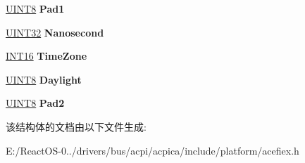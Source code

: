 \begin{DoxyCompactItemize}
\hyperlink{_processor_bind_8h_ab27e9918b538ce9d8ca692479b375b6a}{U\+I\+N\+T8} {\bfseries Pad1}
\item 
\mbox{\label{struct_a_c_p_i___e_f_i___t_i_m_e_af2ab8a79139fa93ad67d5b965c0c0271}} 
\hyperlink{_processor_bind_8h_ae1e6edbbc26d6fbc71a90190d0266018}{U\+I\+N\+T32} {\bfseries Nanosecond}
\item 
\mbox{\label{struct_a_c_p_i___e_f_i___t_i_m_e_ae92b53dcc68a3d322abbb6636da35bf9}} 
\hyperlink{_processor_bind_8h_a30f500129d8c688af07726d5d34ce52d}{I\+N\+T16} {\bfseries Time\+Zone}
\item 
\mbox{\label{struct_a_c_p_i___e_f_i___t_i_m_e_a6e7385e000023a55251b8116102688a2}} 
\hyperlink{_processor_bind_8h_ab27e9918b538ce9d8ca692479b375b6a}{U\+I\+N\+T8} {\bfseries Daylight}
\item 
\mbox{\label{struct_a_c_p_i___e_f_i___t_i_m_e_adae42f3d0a4c45df96c9a4af6aca8acf}} 
\hyperlink{_processor_bind_8h_ab27e9918b538ce9d8ca692479b375b6a}{U\+I\+N\+T8} {\bfseries Pad2}
\end{DoxyCompactItemize}


该结构体的文档由以下文件生成\+:\begin{DoxyCompactItemize}
\item 
E\+:/\+React\+O\+S-\/0../drivers/bus/acpi/acpica/include/platform/acefiex.\+h\end{DoxyCompactItemize}
